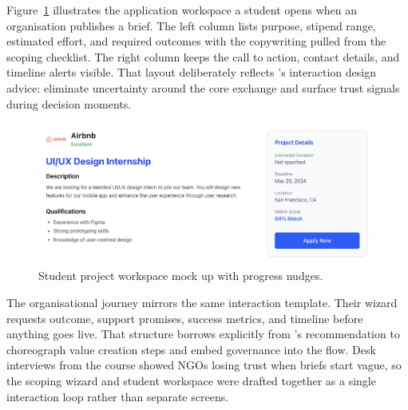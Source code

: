 Figure~\ref{fig:student-view} illustrates the application workspace a student opens when an organisation publishes a brief. The left column lists purpose, stipend range, estimated effort, and required outcomes with the copywriting pulled from the scoping checklist. The right column keeps the call to action, contact details, and timeline alerts visible. That layout deliberately reflects \citet{Choudary2016}'s interaction design advice: eliminate uncertainty around the core exchange and surface trust signals during decision moments.

\begin{figure}[H]
  \centering
  \includegraphics[width=0.85\linewidth]{figures/Student-Project-View.png}
  \caption{Student project workspace mock up with progress nudges.}
  \label{fig:student-view}
\end{figure}

The organisational journey mirrors the same interaction template. Their wizard requests outcome, support promises, success metrics, and timeline before anything goes live. That structure borrows explicitly from \citet{Reillier2017}'s recommendation to choreograph value creation steps and embed governance into the flow. Desk interviews from the course showed NGOs losing trust when briefs start vague, so the scoping wizard and student workspace were drafted together as a single interaction loop rather than separate screens.
